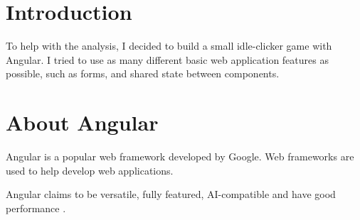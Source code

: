 \documentclass{article}
\begin{document}
\section{Introduction}

To help with the analysis, I decided to build a small idle-clicker game with
Angular. I tried to use as many different basic web application features as
possible, such as forms, and shared state between components.

\section{About Angular}

Angular is a popular web framework developed by Google. Web frameworks are used
to help develop web applications.

Angular claims to be versatile, fully featured, AI-compatible and have good
performance \cite{angularDocs}.



\end{document}
